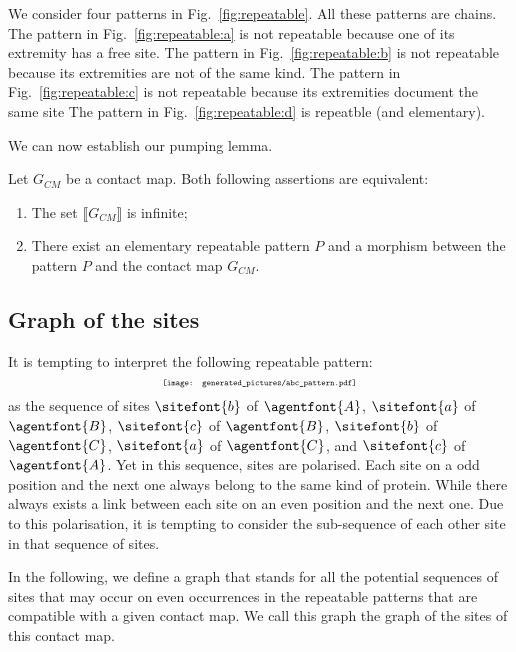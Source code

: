\documentclass{entcs}
\newcommand{\graphsymb}{G}
\begin{document}
\begin{exmp}
  We consider four patterns in Fig.~\ref{fig:repeatable}.
  All these patterns are chains.
  The pattern in Fig.~\ref{fig:repeatable:a} is not repeatable because one of its extremity has a free site.
  The pattern in Fig.~\ref{fig:repeatable:b} is not repeatable
  because its extremities are not of the same kind.
  The pattern in Fig.~\ref{fig:repeatable:c} is not repeatable
  because its extremities document the same site
  The pattern in Fig.~\ref{fig:repeatable:d} is repeatble (and elementary).
\end{exmp}

We can now establish our pumping lemma.
\begin{lemma}
Let $\graphsymb_{\textit{CM}}$ be a contact map.
Both following assertions are equivalent:
\begin{enumerate}
  \item The set $\llbracket \graphsymb_{\textit{CM}} \rrbracket$ is infinite;
  \item There exist an elementary repeatable pattern $P$ and a morphism
  between the pattern $P$ and the contact map $\graphsymb_{\textit{CM}}$.
\end{enumerate}
\end{lemma}

\subsection{Graph of the sites}

It is  tempting to interpret the following repeatable pattern:
\begin{equation*}
\scalebox{0.6}{\texttt{[image: generated\_pictures/abc\_pattern.pdf]}}
\end{equation*}
as the sequence of sites $\sitefont{b}$ of $\agentfont{A}$, $\sitefont{a}$ of $\agentfont{B}$, $\sitefont{c}$ of $\agentfont{B}$, $\sitefont{b}$ of $\agentfont{C}$, $\sitefont{a}$ of $\agentfont{C}$, and $\sitefont{c}$ of $\agentfont{A}$. Yet in this sequence, sites are polarised.
Each site on a odd position and the next one always belong to the same kind of protein.
While there always exists a link between each site on an even position and the next one. Due to this polarisation, it is tempting to consider the sub-sequence of each other site in that sequence of sites.

In the following, we define a graph that stands for all the potential sequences of sites that may occur on even occurrences in the repeatable patterns that are compatible with a given contact map. We call this graph the graph of the sites of this contact map.
\end{document}
